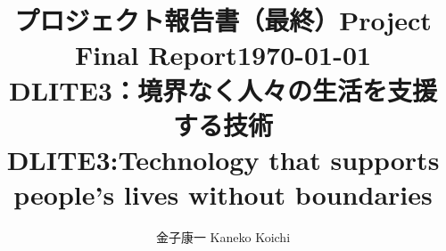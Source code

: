 \documentclass[a4paper,11pt, twocolumn]{ltjsarticle}
\title{
  \normalsize プロジェクト報告書（最終）Project Final Report\hspace{\fill}\today\\
  \LARGE DLITE3：境界なく人々の生活を支援する技術\\
  \Large DLITE3:Technology that supports people's lives without boundaries}
\author{金子康一 Kaneko Koichi}
\date{}
\begin{document}
\maketitle

\vspace{2em}

\renewcommand{\rmdefault}{ptm} %
\renewcommand{\seriesdefault}{m} %

\renewcommand{\refname}{参考文献}

\end{document}

